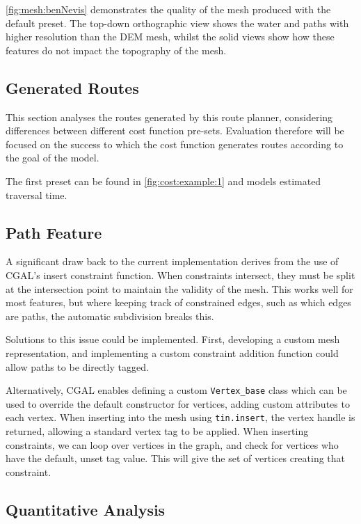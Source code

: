 \documentclass[12pt]{article}
\begin{document}
\autoref{fig:mesh:benNevis} demonstrates the quality of the mesh produced with the default preset. The top-down orthographic view shows the water and paths with higher resolution than the DEM mesh, whilst the solid views show how these features do not impact the topography of the mesh.

\subsection{Generated Routes}

This section analyses the routes generated by this route planner, considering differences between different cost function pre-sets. Evaluation therefore will be focused on the success to which the cost function generates routes according to the goal of the model.

The first preset can be found in \autoref{fig:cost:example:1} and models estimated traversal time.

\subsection{Path Feature}

A significant draw back to the current implementation derives from the use of CGAL's insert constraint function. When constraints intersect, they must be split at the intersection point to maintain the validity of the mesh. This works well for most features, but where keeping track of constrained edges, such as which edges are paths, the automatic subdivision breaks this.

Solutions to this issue could be implemented. First, developing a custom mesh representation, and implementing a custom constraint addition function could allow paths to be directly tagged.

Alternatively, CGAL enables defining a custom \texttt{Vertex\_base} class which can be used to override the default constructor for vertices, adding custom attributes to each vertex. When inserting into the mesh using \texttt{tin.insert}, the vertex handle is returned, allowing a standard vertex tag to be applied. When inserting constraints, we can loop over vertices in the graph, and check for vertices who have the default, unset tag value. This will give the set of vertices creating that constraint.

\subsection{Quantitative Analysis}
\end{document}
